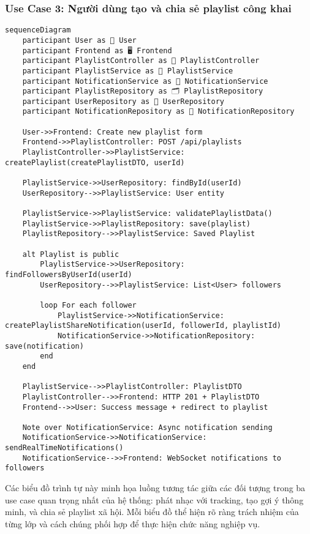 \subsubsection{Use Case 3: Người dùng tạo và chia sẻ playlist công khai}

\begin{verbatim}
sequenceDiagram
    participant User as 👤 User
    participant Frontend as 🖥️ Frontend
    participant PlaylistController as 📝 PlaylistController
    participant PlaylistService as 🎵 PlaylistService
    participant NotificationService as 🔔 NotificationService
    participant PlaylistRepository as 🗂️ PlaylistRepository
    participant UserRepository as 👥 UserRepository
    participant NotificationRepository as 📢 NotificationRepository

    User->>Frontend: Create new playlist form
    Frontend->>PlaylistController: POST /api/playlists
    PlaylistController->>PlaylistService: createPlaylist(createPlaylistDTO, userId)
    
    PlaylistService->>UserRepository: findById(userId)
    UserRepository-->>PlaylistService: User entity
    
    PlaylistService->>PlaylistService: validatePlaylistData()
    PlaylistService->>PlaylistRepository: save(playlist)
    PlaylistRepository-->>PlaylistService: Saved Playlist
    
    alt Playlist is public
        PlaylistService->>UserRepository: findFollowersByUserId(userId)
        UserRepository-->>PlaylistService: List<User> followers
        
        loop For each follower
            PlaylistService->>NotificationService: createPlaylistShareNotification(userId, followerId, playlistId)
            NotificationService->>NotificationRepository: save(notification)
        end
    end
    
    PlaylistService-->>PlaylistController: PlaylistDTO
    PlaylistController-->>Frontend: HTTP 201 + PlaylistDTO
    Frontend-->>User: Success message + redirect to playlist

    Note over NotificationService: Async notification sending
    NotificationService->>NotificationService: sendRealTimeNotifications()
    NotificationService-->>Frontend: WebSocket notifications to followers
\end{verbatim}

Các biểu đồ trình tự này minh họa luồng tương tác giữa các đối tượng trong ba use case quan trọng nhất của hệ thống: phát nhạc với tracking, tạo gợi ý thông minh, và chia sẻ playlist xã hội. Mỗi biểu đồ thể hiện rõ ràng trách nhiệm của từng lớp và cách chúng phối hợp để thực hiện chức năng nghiệp vụ. 